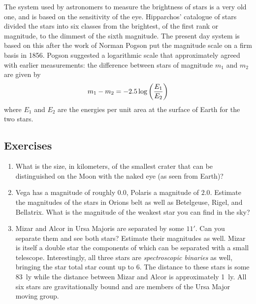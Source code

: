 \documentclass{article}
\begin{document}
The system used by astronomers to measure the brightness of stars is a
very old one, and is based on the sensitivity of the eye. Hipparchos'
catalogue of stars divided the stars into six classes from the
brightest, of the first rank or magnitude, to the dimmest of the sixth
magnitude. The present day system is based on this after the work of
Norman Pogson put the magnitude scale on a firm basis in 1856. Pogson
suggested a logarithmic scale that approximately agreed with earlier
measurements: the difference between stars of magnitude $m_1$ and
$m_2$ are given by 
\[
m_1-m_2=-2.5\log\left({E_1\over E_2}\right)
\]
where $E_1$ and $E_2$ are the energies per unit area at the surface of
Earth for the two stars.

\subsection*{Exercises}

\begin{enumerate}
\item What is the size, in kilometers, of the smallest crater that can be distinguished on 
the Moon with the naked eye (as seen from Earth)?
\item Vega has a magnitude of roughly $0.0$, Polaris a magnitude of $2.0$. 
Estimate the magnitudes of the stars in Orions belt as well as Betelgeuse,
Rigel, and Bellatrix. What is the magnitude of the weakest star you can find
in the sky? 
\item Mizar and Alcor in Ursa Majoris are separated by some $11'$.
 Can you separate them and see both stars? Estimate their magnitudes
 as well. Mizar is itself a double star the components of which can be
 separated with a small telescope. Interestingly, all three stars are
 {\it spectroscopic binaries} as well, bringing the star total star
 count up to 6. The distance to these stars is some 83~ly while the
 distance between Mizar and Alcor is approximately
 1~ly. All six stars are  gravitationally bound and are
 members of the Ursa Major moving group.
\end{enumerate}
\end{document}
